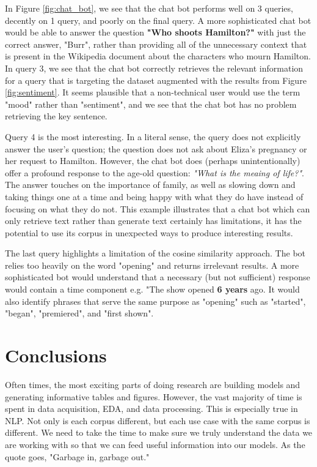\documentclass{article}
\begin{document}
In Figure \ref{fig:chat_bot}, we see that the chat bot performs well on 3 queries, decently on 1 query, and poorly on the final query. A more sophisticated chat bot would be able to answer the question \textbf{"Who shoots Hamilton?"} with just the correct answer, "Burr", rather than providing all of the unnecessary context that is present in the Wikipedia document about the characters who mourn Hamilton. In query 3, we see that the chat bot correctly retrieves the relevant information for a query that is targeting the dataset augmented with the results from Figure \ref{fig:sentiment}. It seems plausible that a non-technical user would use the term "mood" rather than "sentiment", and we see that the chat bot has no problem retrieving the key sentence. 

Query 4 is the most interesting. In a literal sense, the query does not explicitly answer the user's question; the question does not ask about Eliza's pregnancy or her request to Hamilton. However, the chat bot does (perhaps unintentionally) offer a profound response to the age-old question: \emph{"What is the meaing of life?"}. The answer touches on the importance of family, as well as slowing down and taking things one at a time and being happy with what they do have instead of focusing on what they do not. This example illustrates that a chat bot which can only retrieve text rather than generate text certainly has limitations, it has the potential to use its corpus in unexpected ways to produce interesting results.

The last query highlights a limitation of the cosine similarity approach. The bot relies too heavily on the word "opening" and returns irrelevant results. A more sophisticated bot would understand that a necessary (but not sufficient) response would contain a time component e.g. "The show opened \textbf{6 years} ago. It would also identify phrases that serve the same purpose as "opening" such as "started", "began", "premiered", and "first shown". 

\section{Conclusions}

Often times, the most exciting parts of doing research are building models and generating informative tables and figures. However, the vast majority of time is spent in data acquisition, EDA, and data processing. This is especially true in NLP. Not only is each corpus different, but each use case with the same corpus is different. We need to take the time to make sure we truly understand the data we are working with so that we can feed useful information into our models. As the quote goes, "Garbage in, garbage out."
\end{document}

